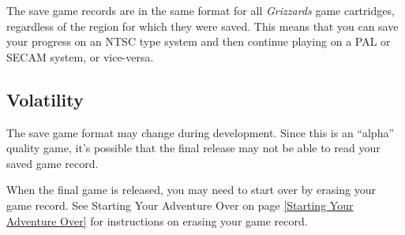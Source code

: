 \documentclass[10pt,twoside,openright]{memoir}
\begin{document}
The save game records are in the same format for all \emph{Grizzards} game
cartridges, regardless of the region for which they were saved.  This means
that you can save your progress on an NTSC type system and then continue
playing on a PAL or SECAM system, or vice-versa.

\subsection{Volatility}

The save game format may change during development. Since this is an
``alpha'' quality game, it's possible that the final release may not
be able to read your saved game record.

When the final game is released, you may need to start over by erasing
your game record. See Starting Your Adventure Over on page
\ref{Starting Your Adventure Over} for instructions on erasing your
game record.
\end{document}
